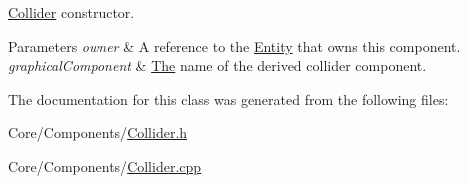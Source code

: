 \hyperlink{classDCEngine_1_1Components_1_1Collider}{Collider} constructor. 


\begin{DoxyParams}{Parameters}
{\em owner} & A reference to the \hyperlink{classDCEngine_1_1Entity}{Entity} that owns this component. \\
\hline
{\em graphical\-Component} & \hyperlink{classThe}{The} name of the derived collider component. \\
\hline
\end{DoxyParams}


The documentation for this class was generated from the following files\-:\begin{DoxyCompactItemize}
\item 
Core/\-Components/\hyperlink{Collider_8h}{Collider.\-h}\item 
Core/\-Components/\hyperlink{Collider_8cpp}{Collider.\-cpp}\end{DoxyCompactItemize}
